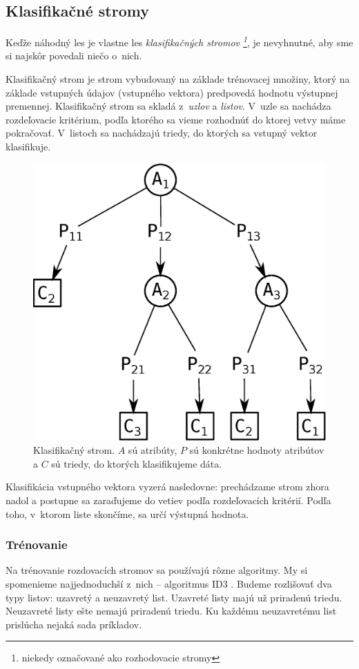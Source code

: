 \subsection{Klasifikačné stromy}
Keďže náhodný les je vlastne les \textit{klasifikačných stromov \footnote{niekedy označované ako rozhodovacie stromy}}, je nevyhnutné, aby sme si najskôr povedali niečo o~nich.

Klasifikačný strom je strom vybudovaný na základe trénovacej množiny, ktorý na základe vstupných údajov (vstupného vektora) predpovedá hodnotu výstupnej premennej. Klasifikačný strom sa skladá z~\textit{uzlov} a \textit{listov}. V~uzle sa nachádza rozdeľovacie kritérium, podľa ktorého sa vieme rozhodnúť do ktorej vetvy máme pokračovať. V~listoch sa nachádzajú triedy, do ktorých sa vstupný vektor klasifikuje.


\begin{figure}[htp]
    \centering
    \includegraphics[width=.5\textwidth]{images/decision_tree}
    \caption[Klasifikačný strom]{Klasifikačný strom. $A$ sú atribúty, $P$ sú konkrétne hodnoty atribútov a $C$ sú triedy, do ktorých klasifikujeme dáta.}
\end{figure}

Klasifikácia vstupného vektora vyzerá nasledovne: prechádzame strom zhora nadol a postupne sa zaraďujeme do vetiev podľa rozdeľovacích kritérií. Podľa toho, v~ktorom liste skončíme, sa určí výstupná hodnota.

\subsubsection{Trénovanie}

Na trénovanie rozdovacích stromov sa používajú rôzne algoritmy. My si spomenieme najjednoduchší z~nich -- algoritmus ID3 \cite{wiki:id3}. Budeme rozlišovať dva typy listov: uzavretý a neuzavretý list. Uzavreté listy majú už priradenú triedu. Neuzavreté listy ešte nemajú priradenú triedu. Ku každému neuzavretému list prislúcha nejaká sada príkladov.

